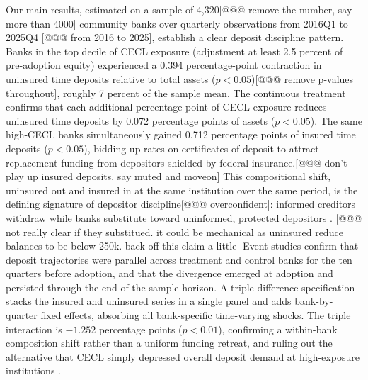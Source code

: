 Our main results, estimated on a sample of 4,320[@@@ remove the number, say more than 4000] community banks over quarterly
observations from 2016Q1 to 2025Q4 [@@@ from 2016 to 2025], establish a clear deposit discipline
pattern.  Banks in the top decile of CECL exposure (adjustment at least 2.5
percent of pre-adoption equity) experienced a 0.394 percentage-point contraction
in uninsured time deposits relative to total assets ($p < 0.05$)[@@@ remove p-values throughout], roughly 7
percent of the sample mean.  The continuous treatment confirms that
each additional percentage point of CECL exposure reduces uninsured time deposits
by 0.072 percentage points of assets ($p < 0.05$).  The same high-CECL banks
simultaneously gained 0.712 percentage points of insured time deposits ($p <
0.05$), bidding up rates on certificates of deposit to attract replacement funding
from depositors shielded by federal insurance.[@@@ don't play up insured deposits. say muted and moveon] This compositional shift, uninsured
out and insured in at the same institution over the same period, is the defining
signature of depositor discipline[@@@ overconfident]: informed creditors withdraw while banks
substitute toward uninformed, protected depositors \citep{calomiris1991role}. [@@@ not really clear if they substitued. it could be mechanical as uninsured reduce balances to be below 250k. back off this claim a little]
Event studies confirm that deposit trajectories were parallel across treatment and
control banks for the ten quarters before adoption, and that the divergence
emerged at adoption and persisted through the end of the sample horizon.  A
triple-difference specification stacks the insured and uninsured series in a
single panel and adds bank-by-quarter fixed effects, absorbing all bank-specific
time-varying shocks.  The triple interaction is $-1.252$ percentage points ($p <
0.01$), confirming a within-bank composition shift rather than a uniform funding
retreat, and ruling out the alternative that CECL simply depressed overall deposit
demand at high-exposure institutions \citep{chen2022bank}.

